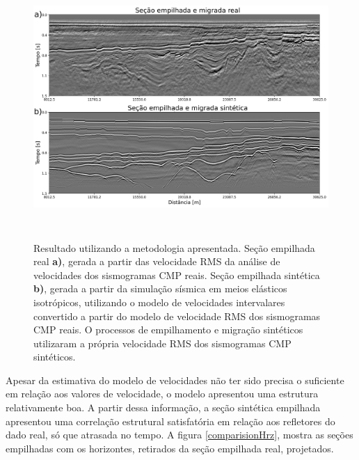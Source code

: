 \documentclass[
	12pt,				%
	openright,			%
	oneside,			%
	a4paper,			%
	english,			%
	brazil				%
	]{abntex2}
\begin{document}
	\begin{figure}[htp!]
		\centering
		\includegraphics[width=16cm,height=10cm]{../imagens/comparision.png}
		\caption{Resultado utilizando a metodologia apresentada. Seção empilhada real \textbf{a)}, gerada a partir das velocidade RMS da análise de velocidades dos sismogramas CMP reais. Seção empilhada sintética \textbf{b)}, gerada a partir da simulação sísmica em meios elásticos isotrópicos, utilizando o modelo de velocidades intervalares convertido a partir do modelo de velocidade RMS dos sismogramas CMP reais. O processos de empilhamento e migração sintéticos utilizaram a própria velocidade RMS dos sismogramas CMP sintéticos.}
		\label{comparision}
	\end{figure}

	Apesar da estimativa do modelo de velocidades não ter sido precisa o suficiente em relação aos valores de velocidade, o modelo apresentou uma estrutura relativamente boa. A partir dessa informação, a seção sintética empilhada apresentou uma correlação estrutural satisfatória em relação aos refletores do dado real, só que atrasada no tempo. A figura \ref{comparisionHrz}, mostra as seções empilhadas com os horizontes, retirados da seção empilhada real, projetados. 
\end{document}

